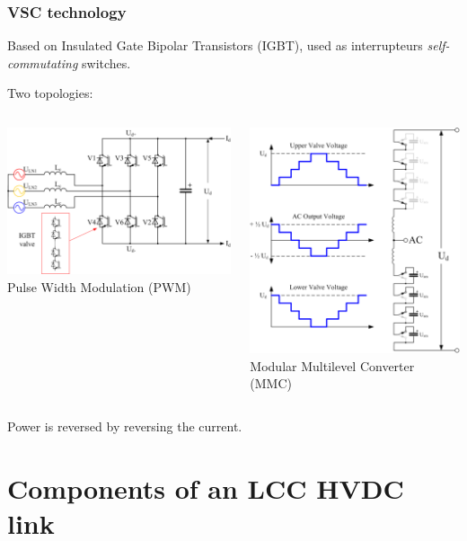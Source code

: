 \begin{frame}
\frametitle{VSC technology}
Based on Insulated Gate Bipolar Transistors (IGBT), used as interrupteurs \textit{self-commutating} switches.

Two topologies:
\begin{columns}
\begin{column}{0.6\linewidth}
\begin{center}
    \includegraphics[width=0.5\linewidth]{images/pwm.png}\\
Pulse Width Modulation (PWM)
\end{center}
\end{column}
\begin{column}{0.4\linewidth}
\begin{center}
    \includegraphics[width=0.5\linewidth]{images/mmc.png} \\
Modular Multilevel Converter (MMC)
\end{center}
\end{column}
\end{columns}
Power is reversed by reversing the current.
\end{frame}




\section{Components of an LCC HVDC link}

